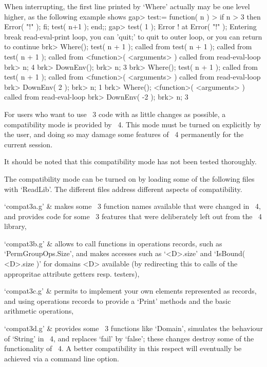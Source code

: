 When interrupting, the first line printed by `Where' actually may be
one level higher, as the following example shows
\begintt
    gap> test:= function( n )
    >    if n > 3 then Error( "!" ); fi; test( n+1 ); end;;
    gap> test( 1 );
    Error ! at
    Error( "!" );
    Entering break read-eval-print loop,
    you can 'quit;' to quit to outer loop,
    or you can return to continue
    brk> Where();
    test( n + 1 ); called from
    test( n + 1 ); called from
    test( n + 1 ); called from
    <function>( <arguments> ) called from read-eval-loop
    brk> n;
    4
    brk> DownEnv();
    brk> n;
    3
    brk> Where();
    test( n + 1 ); called from
    test( n + 1 ); called from
    <function>( <arguments> ) called from read-eval-loop
    brk> DownEnv( 2 );
    brk> n;
    1
    brk> Where();
    <function>( <arguments> ) called from read-eval-loop
    brk> DownEnv( -2 );
    brk> n;
    3
\endtt




For users who want to use {\GAP}~3 code with as little changes as
possible, a compatibility mode is provided by {\GAP}~4.
This mode must be turned on explicitly by the user,
and doing so may damage some features of {\GAP}~4 permanently
for the current session.

It should be noted that this compatibility mode has not been tested
thoroughly.

The compatibility mode can be turned on by loading some of the following
files with `ReadLib'.
The different files address different aspects of compatibility.

\beginitems
`compat3a.g' &
    makes some {\GAP}~3 function names available that were changed
    in {\GAP}~4,
    and provides code for some {\GAP}~3 features that were
    deliberately left out from the {\GAP}~4 library,

`compat3b.g' &
    allows to call functions in operations records, such as
    `PermGroupOps.Size',
    and makes accesses such as `<D>.size' and `IsBound( <D>.size )'
    for domains <D> available (by redirecting this to calls of the
    appropritae attribute getters resp. testers),

`compat3c.g' &
    permits to implement your own elements represented as records,
    and using operations records to provide a `Print' methods and
    the basic arithmetic operations,

`compat3d.g' &
    provides some {\GAP}~3 functions like `Domain', simulates the
    behaviour of `String' in {\GAP}~4, and replaces `fail' by `false';
    these changes destroy some of the functionality of {\GAP}~4.
    A better compatibility in this respect will eventually be achieved
    via a command line option.
\enditems


